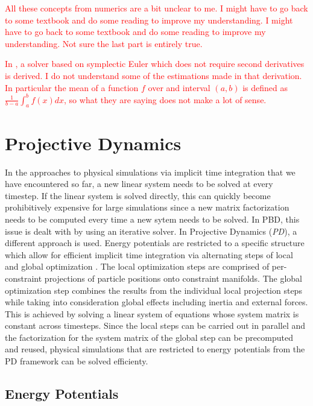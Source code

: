 \textcolor{red}{
    All these concepts from numerics are a bit unclear to me. I might have to go back to some textbook and do some reading to improve my understanding. 
    I might have to go back to some textbook and do some reading to improve my understanding. Not sure the last part is entirely true.}

\textcolor{red}{
    In \cite{servin2006}, a solver based on symplectic Euler which does not require second derivatives is derived. I do not understand some of the
    estimations made in that derivation. In particular the mean of a function $f$ over and interval $(a, b)$ is defined as $\frac{1}{b-a}
    \int_a^b f(x) dx$, so what they are saying does not make a lot of sense.}


\section{Projective Dynamics}\label{s:pd}

In the approaches to physical simulations via implicit time integration that we have encountered so far, a new linear system needs to be solved
at every timestep. If the linear system is solved directly, this can quickly become prohibitively expensive for large simulations since 
a new matrix factorization needs to be computed every time a new sytem needs to be solved. In PBD, this issue is dealt with by using an iterative 
solver. In Projective Dynamics (\emph{PD}), a different approach is used. Energy potentials are restricted to a specific structure which allow for 
efficient implicit time integration via alternating steps of local and global optimization \cite{bouaziz2014}. The local optimization 
steps are comprised of 
per-constraint projections of particle positions onto constraint manifolds. The global optimization step combines the results from the individual 
local projection steps while taking into consideration global effects including inertia and external forces. This is achieved by solving a 
linear system of equations whose system matrix is constant across timesteps. Since the local steps can be carried out in parallel and the 
factorization for the system matrix of the global step can be precomputed and reused, physical simulations that are restricted to energy potentials 
from the PD framework can be solved efficienty.

\subsection{Energy Potentials}\label{ss:pd-potentials}

